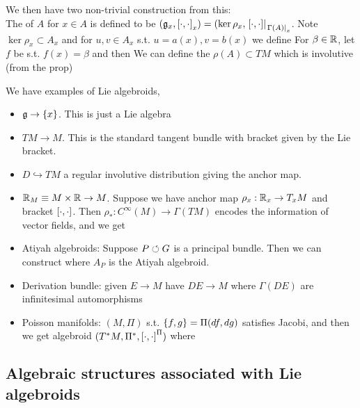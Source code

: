 \documentclass{article}
\begin{document}
We then have two non-trivial construction from this: \\
The  of $A$  for $x \in A$ is defined to be $(\mf{g}_x, \comm[\cdot]{\cdot}_x) = (\ker \rho_x, \ev{\comm[\cdot]{\cdot}}{\ev{\Gamma(A)}{x}}$. Note $\ker \rho_x \subset A_x$ and for $u,v \in A_x$ s.t. $u=a(x), v=b(x)$ we define 
For $\beta \in \mbb{R}$, let $f$ be s.t. $f(x) = \beta$ and then 
We can define the  $\rho(A) \subset TM$ which is involutive (from the prop) 
\begin{example}
We have examples of Lie algebroids,
\begin{itemize}
    \item $\mf{g}\to \pbrace{x}$. This is just a Lie algebra
    \item $TM \to M$. This is the standard tangent bundle with bracket given by the Lie bracket. 
    \item $D \hookrightarrow TM$ a regular involutive distribution giving the anchor map.
    \item $\mbb{R}_M \equiv M \times \mbb{R} \to M$. Suppose we have anchor map $\rho_x : \mbb{R}_x \to T_x M $ and bracket $\comm[\cdot]{\cdot}$. Then $\rho_\ast : C^\infty(M) \to \Gamma(TM)$ encodes the information of vector fields, and we get 
    \item Atiyah algebroids: Suppose $P \ract G$ is a principal bundle. Then we can construct 
    where $A_P$ is the Atiyah algebroid.
    \item Derivation bundle: given $E \to M$ have $DE \to M$ where $\Gamma(DE)$ are infinitesimal automorphisms
    \item Poisson manifolds: $(M,\Pi)$ s.t. $\acomm[f]{g}= \Pi(df,dg)$ satisfies Jacobi, and then we get algebroid $(T^\ast M, \Pi^\ast, \comm[\cdot]{\cdot}^\Pi)$ where 
\end{itemize}
\end{example}

\subsection{Algebraic structures associated with Lie algebroids}
\end{document}
